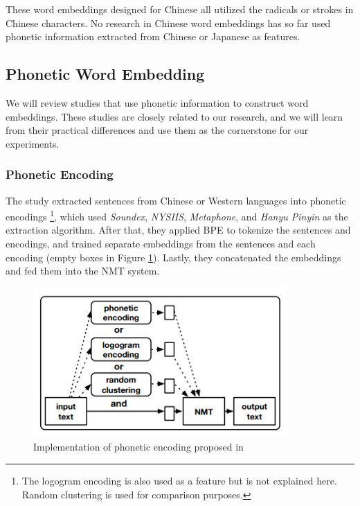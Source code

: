 These word embeddings designed for Chinese all utilized the radicals or strokes in Chinese characters. No research in Chinese word embeddings has so far used phonetic information extracted from Chinese or Japanese as features.

\subsection{Phonetic Word Embedding} \label{sec:rw_pwe}

We will review studies that use phonetic information to construct word embeddings. These studies are closely related to our research, and we will learn from their practical differences and use them as the cornerstone for our experiments.

\subsubsection{Phonetic Encoding}

The study \cite{khan2019diversity} extracted sentences from Chinese or Western languages into phonetic encodings \footnote{The logogram encoding is also used as a feature but is not explained here. Random clustering is used for comparison purposes.}, which used \textit{Soundex}, \textit{NYSIIS}, \textit{Metaphone}, and \textit{Hanyu Pinyin} as the extraction algorithm. After that, they applied BPE \cite{sennrich_neural_2016} to tokenize the sentences and encodings, and trained separate embeddings from the sentences and each encoding (empty boxes in Figure \ref{fig:phonetic1}). Lastly, they concatenated the embeddings and fed them into the NMT system. 

\begin{figure}[h]
	\centering
	\includegraphics[scale=0.9]{../images/phonetic_encoding.png}
	\caption{Implementation of phonetic encoding proposed in \cite{khan2019diversity}}
	\label{fig:phonetic1}
\end{figure}

